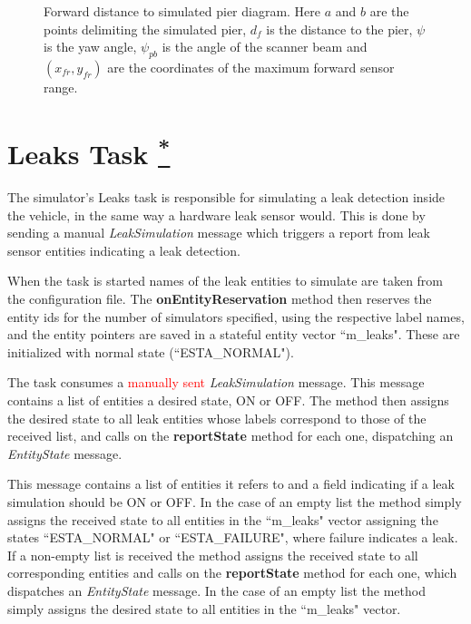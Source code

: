 \documentclass[10pt,a4paper]{article}
\begin{document}
\begin{figure}[h]
  \centering
  	
  \caption{Forward distance to simulated pier diagram. Here $a$ and $b$ are the points delimiting the simulated pier, $d_f$ is the distance to the pier, $\psi$ is the yaw angle, $\psi_{pb}$ is the angle of the scanner beam and $\left(x_{fr}, y_{fr}\right)$ are the coordinates of the maximum forward sensor range.}
  \label{forward_distance_pier}
\end{figure}


\section{Leaks Task \href{https://www.lsts.pt/docs/dune/dune-2017.01.0-dmsmw/d2/d45/structSimulators_1_1Leaks_1_1Task.html}{\textsuperscript{*}}}

\par The simulator's Leaks task is responsible for simulating a leak detection inside the vehicle, in the same way a hardware leak sensor would. This is done by sending a manual \textit{LeakSimulation} message which triggers a report from leak sensor entities indicating a leak detection.

\par When the task is started names of the leak entities to simulate are taken from the configuration file. The \textbf{onEntityReservation} method then reserves the entity ids for the number of simulators specified, using the respective label names, and the entity pointers are saved in a stateful entity vector ``m\_leaks". These are initialized with normal state (``ESTA\_NORMAL").

\par The task consumes a \textcolor{red}{manually sent} \textit{LeakSimulation} message. This message contains a list of entities a desired state, ON or OFF. The method then assigns the desired state to all leak entities whose labels correspond to those of the received list, and calls on the \textbf{reportState} method for each one, dispatching an \textit{EntityState} message.

This message contains a list of entities it refers to and a field indicating if a leak simulation should be ON or OFF. In the case of an empty list the method simply assigns the received state to all entities in the ``m\_leaks" vector assigning the states ``ESTA\_NORMAL" or ``ESTA\_FAILURE", where failure indicates a leak. If a non-empty list is received the method assigns the received state to all corresponding entities and calls on the \textbf{reportState} method for each one, which dispatches an \textit{EntityState} message. In the case of an empty list the method simply assigns the desired state to all entities in the ``m\_leaks" vector.
\end{document}

